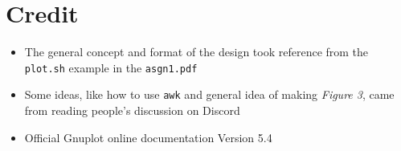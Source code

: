 \documentclass[12pt]{article}
\begin{document}
\section{Credit}

\begin{itemize}
  \item The general concept and format of the design took reference from the \texttt{plot.sh} example in the \texttt{asgn1.pdf}
  \item Some ideas, like how to use \texttt{awk} and general idea of making \textit{Figure 3}, came from reading people's discussion on Discord
  \item Official Gnuplot online documentation Version 5.4
\end{itemize}
\end{document}

